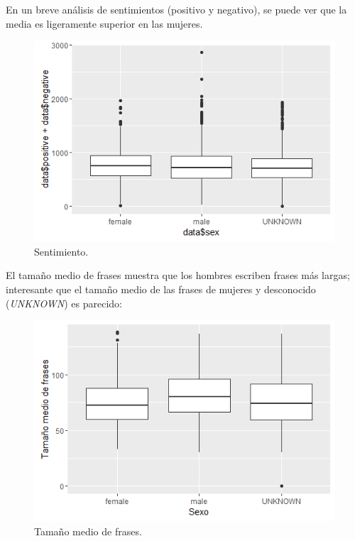 \documentclass[11pt,a4paper]{article}
\begin{document}
  En un breve an\'alisis de sentimientos (positivo y negativo), se puede ver que la media es ligeramente superior en las mujeres.
  
  \begin{figure}[ht!]
    \includegraphics[width=\linewidth]{sentiment.png}
    \caption{Sentimiento.}
    \label{fig:sentiment}
  \end{figure}
  
  El tama\~no medio de frases muestra que los hombres escriben frases m\'as largas; interesante que el tama\~no medio de las frases de mujeres y desconocido ({\em UNKNOWN}) es parecido:

  \begin{figure}[ht!]
    \includegraphics[width=\linewidth]{sentence_mean.png}
    \caption{Tama\~no medio de frases.}
    \label{fig:sentence_mean}
  \end{figure}
  
\end{document}
